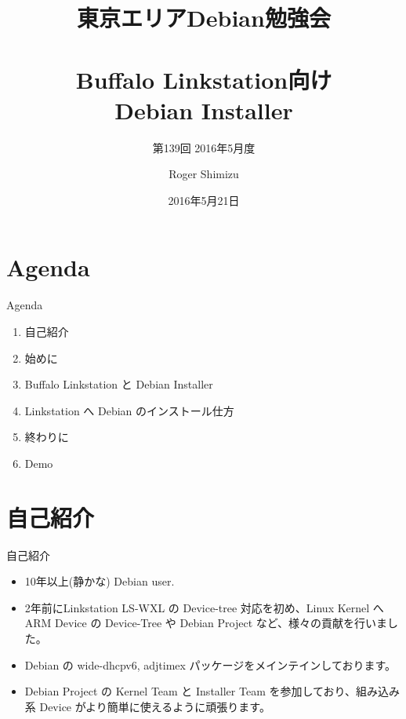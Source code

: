 \title{東京エリアDebian勉強会\\　\\Buffalo Linkstation向け\\Debian Installer}
\subtitle{第139回 2016年5月度}
\author{Roger Shimizu}
\date{2016年5月21日}



\frame{\titlepage{}}

\section{Agenda}
\begin{frame}{Agenda}
\begin{enumerate}
\item 自己紹介
\item 始めに
\item Buffalo Linkstation と Debian Installer
\item Linkstation へ Debian のインストール仕方
\item 終わりに
\item Demo
\end{enumerate}
\end{frame}

\section{自己紹介}

\begin{frame}{自己紹介}
\begin{itemize}
\item 10年以上(静かな) Debian user.
\item 2年前にLinkstation LS-WXL の Device-tree 対応を初め、Linux Kernel へ ARM Device の Device-Tree や Debian Project など、様々の貢献を行いました。
\item Debian の wide-dhcpv6, adjtimex パッケージをメインテインしております。
\item Debian Project の Kernel Team と Installer Team を参加しており、組み込み系 Device がより簡単に使えるように頑張ります。
\end{itemize}
\end{frame}

